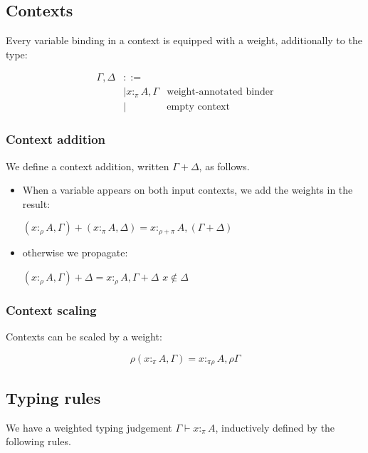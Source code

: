 \documentclass[11pt]{article}
\begin{document}
\subsection{Contexts}
\label{sec:orgheadline6}

Every variable binding in a context is equipped with a weight,
additionally to the type:

\begin{align*}
  Γ,Δ & ::=\\
    & |  x :_π A, Γ & \text{weight-annotated binder} \\
    & |     & \text {empty context}
\end{align*}

\subsubsection{Context addition}
\label{sec:orgheadline4}

We define a context addition, written \(Γ+Δ\), as follows.

\begin{itemize}
\item When a variable appears on both input contexts, we add the weights in
the result:

\((x :_ρ A,Γ) + (x :_π A,Δ) = x :_{ρ+π} A, (Γ+Δ)\)

\item otherwise we propagate:

\((x :_ρ A,Γ) + Δ = x :_ρ A, Γ+Δ\)   \hfill   \(x ∉ Δ\)
\end{itemize}


\subsubsection{Context scaling}
\label{sec:orgheadline5}

Contexts can be scaled by a weight:

\begin{displaymath}
ρ(x :_π A, Γ) =  x :_{πρ} A, ρΓ
\end{displaymath}

\subsection{Typing rules}
\label{sec:orgheadline7}

We have a weighted typing judgement \(Γ ⊢ x:_π A\), inductively defined by the following rules.
\end{document}
